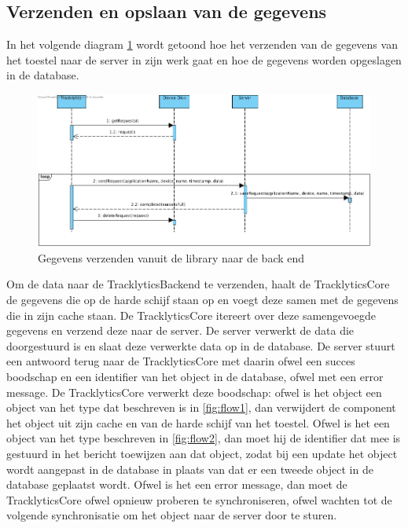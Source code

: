 \subsection{Verzenden en opslaan van de gegevens} \label{sec:VerzendenEnOpslaanVanGegevens}
In het volgende diagram \ref{fig:flow3} wordt getoond hoe het verzenden van de gegevens van het toestel naar de server in zijn werk gaat en hoe de gegevens worden opgeslagen in de database. \\
\begin{figure}[!h]
  \centering
  \includegraphics[scale=0.4]{Afbeeldingen/Architectuur/FlowDiagram3}
  \caption{Gegevens verzenden vanuit de library naar de back end}
  \label{fig:flow3}
\end{figure}

Om de data naar de TracklyticsBackend te verzenden, haalt de TracklyticsCore de gegevens die op de harde schijf staan op en voegt deze samen met de gegevens die in zijn cache staan. De TracklyticsCore itereert over deze samengevoegde gegevens en verzend deze naar de server. De server verwerkt de data die doorgestuurd is en slaat deze verwerkte data op in de database. De server stuurt een antwoord terug naar de TracklyticsCore met daarin ofwel een succes boodschap en een identifier van het object in de database, ofwel met een error message. De TracklyticsCore verwerkt deze boodschap: ofwel is het object een object van het type dat beschreven is in \ref{fig:flow1}, dan verwijdert de component het object uit zijn cache en van de harde schijf van het toestel. Ofwel is het een object van het type beschreven in \ref{fig:flow2}, dan moet hij de identifier dat mee is gestuurd in het bericht toewijzen aan dat object, zodat bij een update het object wordt aangepast in de database in plaats van dat er een tweede object in de database geplaatst wordt. Ofwel is het een error message, dan moet de TracklyticsCore ofwel opnieuw proberen te synchroniseren, ofwel wachten tot de volgende synchronisatie om het object naar de server door te sturen.\\

